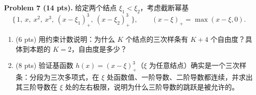 \documentclass[11pt]{ctexart}
\begin{document}
\noindent\textbf{Problem 7 (14 pts).} 给定两个结点 $\xi_1 < \xi_2$，考虑截断幂基
\[
\big\{\,1,\ x,\ x^2,\ x^3,\ (x-\xi_1)_+^3,\ (x-\xi_2)_+^3\,\big\}, \qquad (x-\xi)_+ = \max(x-\xi, 0).
\]
\begin{enumerate}
\item (6 pts) 用约束计数说明：为什么 $K$ 个结点的三次样条有 $K+4$ 个自由度？具体到本题的 $K = 2$，自由度是多少？
\item (8 pts) 验证基函数 $h(x) = (x-\xi)_+^3$（$\xi$ 为任意结点）确实是一个三次样条：分段为三次多项式，在 $\xi$ 处函数值、一阶导数、二阶导数都连续，并求出其三阶导数在 $\xi$ 处的左右极限，说明为什么三阶导数的跳跃是被允许的。
\end{enumerate}
\end{document}
